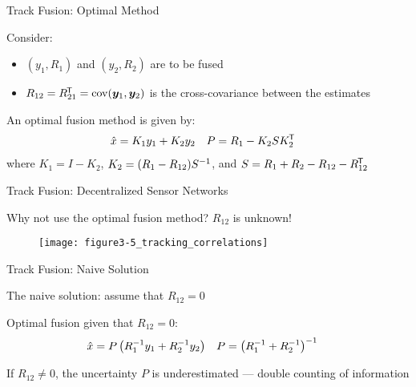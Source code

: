 \documentclass[aspectratio=1610]{beamer}
\begin{document}
\begin{frame}{Track Fusion: Optimal Method}

Consider:
\begin{itemize}
    \item $(y_1,R_1)$ and $(y_2,R_2)$ are to be fused
    \item $R_{12}=R_{21}^{\mkern-1.5mu\mathsf{T}}=\operatorname*{\rm cov}(\bm{y}_1,\bm{y}_2)$ is the cross-covariance between the estimates
\end{itemize}

An optimal fusion method is given by:
\begin{align*}
    \hat{x} &= K_1y_1 + K_2y_2 &
    P &= R_1 - K_2SK_2^{\mkern-1.5mu\mathsf{T}}
\end{align*}
where $K_1=I-K_2$, $K_2=(R_1-R_{12})S^{-1}$, and $S=R_1+R_2-R_{12}-R_{12}^{\mkern-1.5mu\mathsf{T}}$

\end{frame}


\begin{frame}{Track Fusion: Decentralized Sensor Networks}

Why not use the optimal fusion method? \alert{$R_{12}$ is unknown!}

\vspace{2em}

\begin{figure}
    \centering
    \texttt{[image: figure3-5\_tracking\_correlations]}
\end{figure}

\end{frame}


\begin{frame}{Track Fusion: Naive Solution}

The naive solution: \alert{assume that $R_{12}=0$}

\vspace{1em}

Optimal fusion given that $R_{12}=0$:
\begin{align*}
    \hat{x} &= P\left(R_1^{-1} y_1 + R_2^{-1} y_2  \right) &
    P &= \left(R_1^{-1} + R_2^{-1} \right)^{-1}
\end{align*}


\vspace{1em}

If $R_{12}\neq0$, the \alert{uncertainty $P$ is underestimated} --- double counting of information

\end{frame}
\end{document}
